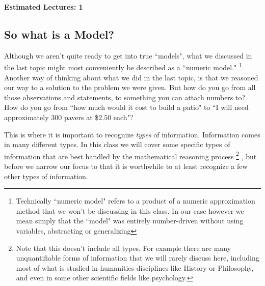 
\ifcompletedNotes
{}
\textbf{Estimated Lectures: 1}
\fi

\subsection{So what is a Model?}
Although we aren't quite ready to get into true ``models", what we discussed in the last topic might most conveniently be described as a ``numeric model."%
\footnote{Technically ``numeric model" refers to a product of a numeric approximation method that we won't be discussing in this class. In our case however we mean simply that the ``model" was entirely number-driven without using variables, abstracting or generalizing}
Another way of thinking about what we did in the last topic, is that we reasoned our way to a solution to the problem we were given. But how do you go from all those observations and statements, to something you can attach numbers to? How do you go from ``how much would it cost to build a patio" to ``I will need approximately 300 pavers at \$$2.50$ each"?

This is where it is important to recognize \textit{types} of information. Information comes in many different types. In this class we will cover some specific types of information that are best handled by the mathematical reasoning process%
\footnote{Note that this doesn't include all types. For example there are many unquantifiable forms of information that we will rarely discuss here, including most of what is studied in humanities disciplines like History or Philosophy, and even in some other scientific fields like psychology.}%
, but before we narrow our focus to that it is worthwhile to at least recognize a few other types of information.

